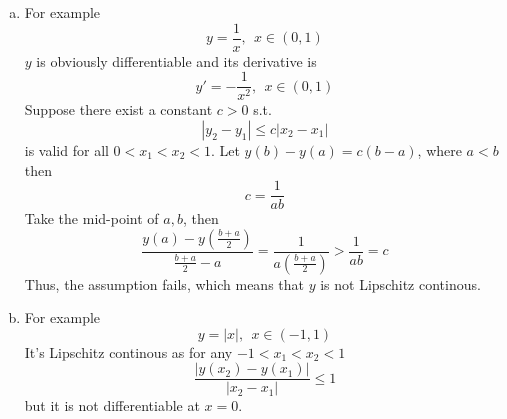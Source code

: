 \documentclass[paper=a4, fontsize=11pt]{scrartcl} %
\numberwithin{equation}{section} %
\numberwithin{figure}{section} %
\numberwithin{table}{section} %
\begin{document}
\begin{enumerate}[(a)]
\begin{proof}
				Thus, from Rolle's theorem, there exists $\xi \in (x_1, x_2)$ s.t. 
				\begin{equation}
					g'(\xi)= 0
				\end{equation}
				namely
				\begin{equation}
					\frac{f(x_2) - f(x_1)}{x_2-x_1} = f'(\xi)
				\end{equation}
				Since $f'$ is bounded, then $|f'(\xi)| \leq M$. Thus
				\begin{equation}
					|f(x_2) - f(x_1)| \leq M |x_2 - x_1|
				\end{equation}
				which means that $f(x)$ is Lipschitz continous.
			\end{proof}
		\item 
			For example
			\begin{equation}
				y = \frac{1}{x}, \ \ x \in (0, 1)
			\end{equation}
			$y$ is obviously differentiable and its derivative is
			\begin{equation}
				y' = -\frac{1}{x^2}, \ \ x \in (0, 1)
			\end{equation}
			Suppose there exist a constant $c>0$ s.t. 
			\begin{equation}
				|y_2 - y_1| \leq c|x_2 - x_1|
			\end{equation}
			is valid for all $0 < x_1 < x_2 < 1$.
			Let $y(b) - y(a) = c(b-a)$, where $a < b$then
			\begin{equation}
				c = \frac{1}{ab}
			\end{equation}
			Take the mid-point of $a, b$, then
			\begin{equation}
				\frac{y(a)-y(\frac{b+a}{2})}{\frac{b+a}{2}-a} = \frac{1}{a(\frac{b+a}{2})} > \frac{1}{ab} = c
			\end{equation}
			Thus, the assumption fails, which means that $y$ is not Lipschitz continous.
		\item 
			For example
			\begin{equation}
				y = |x|, \ \ x \in (-1, 1)
			\end{equation}
			It's Lipschitz continous as for any $-1 < x_1 < x_2 < 1$
			\begin{equation}
				\frac{|y(x_2)-y(x_1)|}{|x_2 - x_1|} \leq 1
			\end{equation}
			but it is not differentiable at $x=0$.
		
	\end{enumerate}

\end{document}
